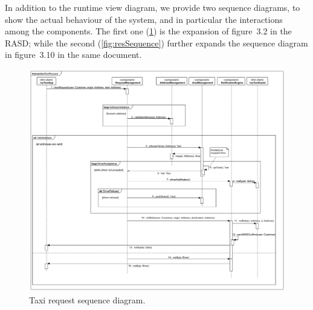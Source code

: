 \clearpage%





In addition to the runtime view diagram, we provide two sequence diagrams, to show the actual behaviour of the system, and in particular the interactions among the components. The first one (\cref{fig:reqSequence}) is the expansion of figure~3.2 in the RASD; while the second (\cref{fig:resSequence}) further expands the sequence diagram in figure~3.10 in the same document.

\begin{figure}%
	\centering%
	\includegraphics[width=\linewidth]{img/Sequence__Collaboration1__Interaction1__TaxiRequest_2}%
	\caption{Taxi request sequence diagram.}\label{fig:reqSequence}%
\end{figure}

